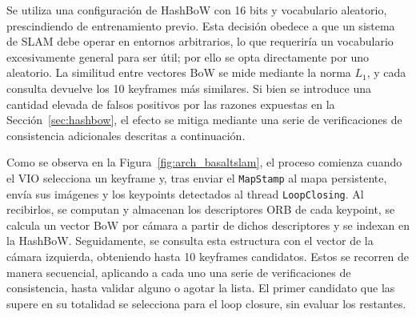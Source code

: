 Se utiliza una configuración de HashBoW con 16 bits y vocabulario aleatorio, prescindiendo de entrenamiento previo. Esta decisión obedece a que un sistema de SLAM debe operar en entornos arbitrarios, lo que requeriría un vocabulario excesivamente general para ser útil; por ello se opta directamente por uno aleatorio. La similitud entre vectores BoW se mide mediante la norma $L_1$, y cada consulta devuelve los 10 keyframes más similares. Si bien se introduce una cantidad elevada de falsos positivos por las razones expuestas en la Sección~\ref{sec:hashbow}, el efecto se mitiga mediante una serie de verificaciones de consistencia adicionales descritas a continuación.
%

Como se observa en la Figura~\ref{fig:arch_basaltslam}, el proceso comienza cuando el VIO selecciona un keyframe y, tras enviar el \texttt{MapStamp} al mapa persistente, envía sus imágenes y los keypoints detectados al thread \texttt{LoopClosing}. Al recibirlos, se computan y almacenan los descriptores ORB de cada keypoint, se calcula un vector BoW por cámara a partir de dichos descriptores y se indexan en la HashBoW. Seguidamente, se consulta esta estructura con el vector de la cámara izquierda, obteniendo hasta 10 keyframes candidatos. Estos se recorren de manera secuencial, aplicando a cada uno una serie de verificaciones de consistencia, hasta validar alguno o agotar la lista. El primer candidato que las supere en su totalidad se selecciona para el loop closure, sin evaluar los restantes.

